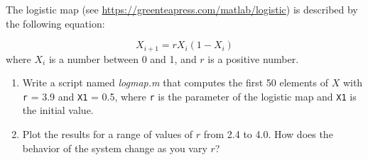 \documentclass[../../book.tex]{subfiles}
\begin{document}
\begin{ex}
The logistic map (see \url{https://greenteapress.com/matlab/logistic}) is described by the following equation:


\begin{equation*}
X_{i+1} = r X_i (1-X_i)
\end{equation*}
where $X_i$ is a number between 0 and 1, and $r$ is a positive number.

\begin{enumerate}

\item Write a script named \emph{logmap.m} that computes the first 50
elements of $X$ with \lstinline{r} = 3.9 and \lstinline{X1} = 0.5, where
\lstinline{r} is the parameter of the logistic map and \lstinline{X1} is the
initial value.

\item Plot the results for a range of values of $r$ from 2.4 to 4.0.
How does the behavior of the system change as you vary $r$?

\end{enumerate}


\end{ex}

\clearpage
\end{document}

